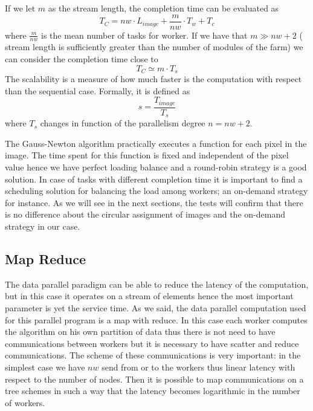If we let $m$ as the stream length, the completion time can be evaluated as
\[
T_{C} = nw \cdot L_{image} + \frac{m}{nw} \cdot T_{w} + T_{c} 
\]
where $\frac{m}{nw}$ is the mean number of tasks for worker.
If we have that $m \gg nw+2$ ( stream length is sufficiently greater than the number of modules of the farm) we can consider the completion time close to
\begin{equation}
\label{completiontime}
T_{C} \simeq m \cdot T_{s}
\end{equation}
The scalability is a measure of how much faster is the computation with respect than the sequential case. 
Formally, it is defined as
\begin{equation}
\label{scalability}
s = \frac{T_{image}}{T_{s}}
\end{equation}
where $T_{s}$ changes in function of the parallelism degree $n=nw+2$.

The Gauss-Newton algorithm practically executes a function for each pixel in the image. 
The time spent for this function is fixed and independent of the pixel value hence we have perfect loading balance and a round-robin strategy is a good solution. 
In case of tasks with different completion time it is important to find a scheduling solution for balancing the load among workers; an on-demand strategy for instance. 
As we will see in the next sections, the tests will confirm that there is no difference about the circular assignment of images and the on-demand strategy in our case.

\subsection{Map Reduce}

The data parallel paradigm can be able to reduce the latency of the computation, but in this case it operates on a stream of elements hence the most important parameter is yet the service time. 
As we said, the data parallel computation used for this parallel program is a map with reduce.
In this case each worker computes the algorithm on his own partition of data thus there is not need to have communications between workers but it is necessary to have scatter and reduce communications. 
The scheme of these communications is very important: in the simplest case we have $nw$ send from or to the workers thus linear latency with respect to the number of nodes.
Then it is possible to map communications on a tree schemes in such a way that the latency becomes logarithmic in the number of workers. 

